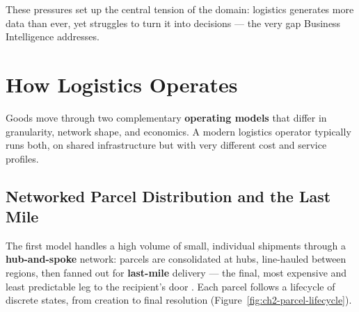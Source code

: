 \noindent These pressures set up the central tension of the domain: logistics generates more data than
ever, yet struggles to turn it into decisions --- the very gap Business Intelligence addresses.

\section{How Logistics Operates}
\label{sec:ch2-operates}

Goods move through two complementary \textbf{operating models} that differ in granularity, network
shape, and economics. A modern logistics operator typically runs both, on shared infrastructure but
with very different cost and service profiles.

\subsection{Networked Parcel Distribution and the Last Mile}

The first model handles a high volume of small, individual shipments through a \textbf{hub-and-spoke}
network: parcels are consolidated at hubs, line-hauled between regions, then fanned out for
\textbf{last-mile} delivery --- the final, most expensive and least predictable leg to the recipient's
door \parencite{christopher2016}. Each parcel follows a lifecycle of discrete states, from creation to
final resolution (Figure~\ref{fig:ch2-parcel-lifecycle}).

